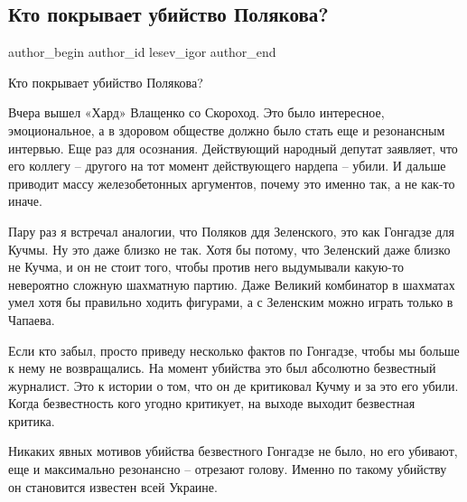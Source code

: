  
 
 
 
 
 
\subsection{Кто покрывает убийство Полякова?}
\label{sec:01_11_2021.fb.lesev_igor.1.ubijstvo_poljakov}
 
\ifcmt
 author_begin
   author_id lesev_igor
 author_end
\fi

Кто покрывает убийство Полякова?

Вчера вышел «Хард» Влащенко со Скороход. Это было интересное, эмоциональное, а
в здоровом обществе должно было стать еще и резонансным интервью. Еще раз для
осознания. Действующий народный депутат заявляет, что его коллегу – другого на
тот момент действующего нардепа – убили. И дальше приводит массу железобетонных
аргументов, почему это именно так, а не как-то иначе.

Пару раз я встречал аналогии, что Поляков ддя Зеленского, это как Гонгадзе для
Кучмы. Ну это даже близко не так. Хотя бы потому, что Зеленский даже близко не
Кучма, и он не стоит того, чтобы против него выдумывали какую-то невероятно
сложную шахматную партию. Даже Великий комбинатор в шахматах умел хотя бы
правильно ходить фигурами, а с Зеленским можно играть только в Чапаева.

Если кто забыл, просто приведу несколько фактов по Гонгадзе, чтобы мы больше к
нему не возвращались. На момент убийства это был абсолютно безвестный
журналист. Это к истории о том, что он де критиковал Кучму и за это его убили.
Когда безвестность кого угодно критикует, на выходе выходит безвестная критика.

Никаких явных мотивов убийства безвестного Гонгадзе не было, но его убивают,
еще и максимально резонансно – отрезают голову. Именно по такому убийству он
становится известен всей Украине.


